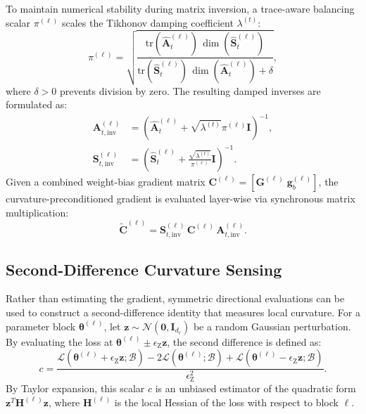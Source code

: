\documentclass[conference]{IEEEtran}
\begin{document}
To maintain numerical stability during matrix inversion, a trace-aware balancing scalar $\pi^{(\ell)}$ scales the Tikhonov damping coefficient $\lambda^{(t)}$:
\begin{equation}
\pi^{(\ell)} = \sqrt{\frac{\mathrm{tr}(\hat{\mathbf{A}}^{(\ell)}_t)\,\dim(\hat{\mathbf{S}}^{(\ell)}_t)}{\mathrm{tr}(\hat{\mathbf{S}}^{(\ell)}_t)\,\dim(\hat{\mathbf{A}}^{(\ell)}_t) + \delta}},
\label{eq:pi_scale}
\end{equation}
where $\delta > 0$ prevents division by zero. The resulting damped inverses are formulated as:
\begin{equation}
\begin{aligned}
\mathbf{A}_{t,\mathrm{inv}}^{(\ell)} &= \left(\hat{\mathbf{A}}^{(\ell)}_t + \sqrt{\lambda^{(t)}}\pi^{(\ell)}\mathbf{I}\right)^{-1}, \\
\mathbf{S}_{t,\mathrm{inv}}^{(\ell)} &= \left(\hat{\mathbf{S}}^{(\ell)}_t + \frac{\sqrt{\lambda^{(t)}}}{\pi^{(\ell)}}\mathbf{I}\right)^{-1}.
\end{aligned}
\end{equation}
Given a combined weight-bias gradient matrix $\mathbf{C}^{(\ell)} = [\mathbf{G}^{(\ell)} \; \mathbf{g}_b^{(\ell)}]$, the curvature-preconditioned gradient is evaluated layer-wise via synchronous matrix multiplication:
\begin{equation}
\tilde{\mathbf{C}}^{(\ell)} = \mathbf{S}_{t,\mathrm{inv}}^{(\ell)} \, \mathbf{C}^{(\ell)} \, \mathbf{A}_{t,\mathrm{inv}}^{(\ell)}.
\label{eq:kfac_precond_op}
\end{equation}

\subsection{Second-Difference Curvature Sensing}
\label{subsec:rdsa_bg}
Rather than estimating the gradient, symmetric directional evaluations can be used to construct a second-difference identity that measures local curvature. For a parameter block $\boldsymbol{\theta}^{(\ell)}$, let $\mathbf{z} \sim \mathcal{N}(\mathbf{0}, \mathbf{I}_{d_\ell})$ be a random Gaussian perturbation. By evaluating the loss at $\boldsymbol{\theta}^{(\ell)} \pm \epsilon_{\mathrm{Z}} \mathbf{z}$, the second difference is defined as:
\begin{equation}
c = \frac{\mathcal{L}(\boldsymbol{\theta}^{(\ell)} + \epsilon_{\mathrm{Z}} \mathbf{z}; \mathcal{B}) - 2\mathcal{L}(\boldsymbol{\theta}^{(\ell)}; \mathcal{B}) + \mathcal{L}(\boldsymbol{\theta}^{(\ell)} - \epsilon_{\mathrm{Z}} \mathbf{z}; \mathcal{B})}{\epsilon_{\mathrm{Z}}^2}.
\label{eq:second_diff}
\end{equation}
By Taylor expansion, this scalar $c$ is an unbiased estimator of the quadratic form $\mathbf{z}^T \mathbf{H}^{(\ell)} \mathbf{z}$, where $\mathbf{H}^{(\ell)}$ is the local Hessian of the loss with respect to block $\ell$.
\end{document}
